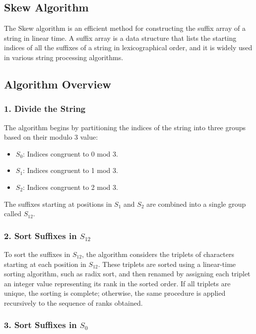 \subsection{Skew Algorithm}
The Skew algorithm is an efficient method for constructing the suffix array of a string in linear time. A suffix array is a data structure that lists the starting indices of all the suffixes of a string in lexicographical order, and it is widely used in various string processing algorithms.

\subsection*{Algorithm Overview}

\subsubsection*{1. Divide the String}

The algorithm begins by partitioning the indices of the string into three groups based on their modulo 3 value:
\begin{itemize}
    \item $S_0$: Indices congruent to 0 mod 3.
    \item $S_1$: Indices congruent to 1 mod 3.
    \item $S_2$: Indices congruent to 2 mod 3.
\end{itemize}

The suffixes starting at positions in $S_1$ and $S_2$ are combined into a single group called $S_{12}$.

\subsubsection*{2. Sort Suffixes in $S_{12}$}

To sort the suffixes in $S_{12}$, the algorithm considers the triplets of characters starting at each position in $S_{12}$. These triplets are sorted using a linear-time sorting algorithm, such as radix sort, and then renamed by assigning each triplet an integer value representing its rank in the sorted order. If all triplets are unique, the sorting is complete; otherwise, the same procedure is applied recursively to the sequence of ranks obtained.

\subsubsection*{3. Sort Suffixes in $S_0$}

